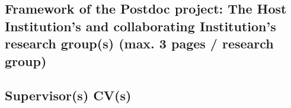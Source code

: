 \documentclass[11pt,twoside,a4paper]{article}
\begin{document}
\subsection{Framework of the Postdoc project: The Host Institution's and
  collaborating Institution's research group(s) (max. 3 pages / research group)}


\subsection{Supervisor(s) CV(s)}

\end{document}

